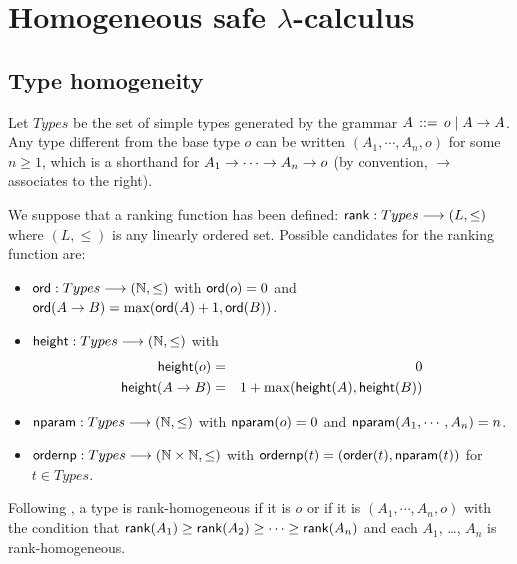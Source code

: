 \section{Homogeneous safe $\lambda$-calculus}
\label{sec:safe_homog}

\subsection{Type homogeneity}
Let $Types$ be the set of simple types generated by the grammar $A
\, ::= \, o \; | \; A \rightarrow A$. Any type different from the base
type $o$ can be written $(A_1, \cdots, A_n, o)$ for some $n \geq 1$,
which is a shorthand for $A_1 \rightarrow \cdots \rightarrow A_n \rightarrow o$ (by
convention, $\rightarrow$ associates to the right).

We suppose that a ranking function has been defined: ${\sf rank} :
Types \longrightarrow (L, \leq)$ where $(L, \leq)$ is any linearly ordered
set. Possible candidates for the ranking function are:
\begin{itemize}
\item ${\sf ord} : Types \longrightarrow (\mathbb{N},\leq)$ with ${\sf ord}(o) = 0$
and ${\sf ord}(A \rightarrow B) = \max({\sf ord}(A)+1, {\sf ord}(B))$.
\item ${\sf height} : Types \longrightarrow (\mathbb{N},\leq)$ with
\begin{eqnarray*}
     {\sf height}(o) &=& 0 \\
     {\sf height}(A \rightarrow B) &=& 1 + \max({\sf height}(A), {\sf height}(B))
\end{eqnarray*}
\item ${\sf nparam} : Types \longrightarrow (\mathbb{N},\leq)$ with ${\sf nparam}(o) = 0$
and ${\sf nparam}(A_1, \cdots, A_n) = n$.
\item ${\sf ordernp} : Types \longrightarrow (\mathbb{N} \times \mathbb{N},\leq)$ with $ {\sf ordernp} (t)  = ({\sf order}(t), {\sf nparam}(t))$ for $t \in Types$.
\end{itemize}


Following \cite{KNU02}, a type is rank-homogeneous if it is $o$ or
if it is $(A_1, \cdots, A_n, o)$ with the condition that ${\sf rank}(A_1)
\geq {\sf rank}(A_2)\geq \cdots \geq {\sf rank}(A_n)$ and each $A_1$, \ldots,
$A_n$ is rank-homogeneous.



